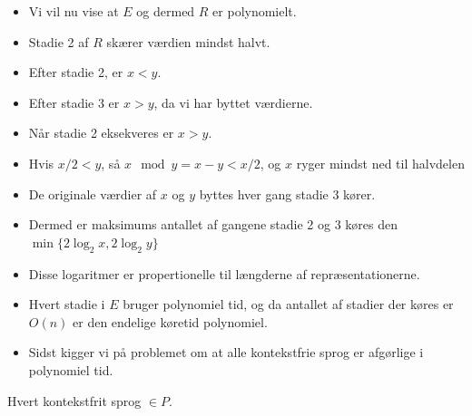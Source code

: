 \begin{frame}[allowframebreaks]
\begin{itemize}
		\item Vi vil nu vise at $E$ og dermed $R$ er polynomielt.
		\item Stadie 2 af $R$ skærer værdien mindst halvt.
		\item Efter stadie 2, er $x < y$.
		\item Efter stadie 3 er $x > y$, da vi har byttet værdierne.
		\item Når stadie 2 eksekveres er $x > y$.
		\item Hvis $x/2 < y$, så $x \mod y = x - y < x / 2$, og $x$ ryger mindst ned til halvdelen
		\item De originale værdier af $x$ og $y$ byttes hver gang stadie 3 kører.
		\item Dermed er maksimums antallet af gangene stadie 2 og 3 køres den $\min\{ 2 \log_{2} x, 2 \log_{2} y\}$
		\item Disse logaritmer er propertionelle til længderne af repræsentationerne.
		\item Hvert stadie i $E$ bruger polynomiel tid, og da antallet af stadier der køres er $O(n)$ er den endelige køretid polynomiel.
		\item Sidst kigger vi på problemet om at alle kontekstfrie sprog er afgørlige i polynomiel tid.
	\end{itemize}

	\begin{theorem}
		Hvert kontekstfrit sprog $\in P$.
	\end{theorem}


\end{frame}

